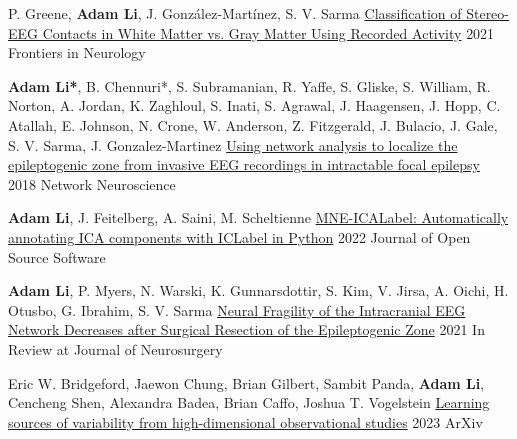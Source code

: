 \begin{cventries}
    \cvpresentation
    {P. Greene, \textbf{Adam Li}, J. González-Martínez, S. V. Sarma} %
    {\href{https://www.ncbi.nlm.nih.gov/pmc/articles/PMC7815703/pdf/fneur-11-605696.pdf}{Classification of Stereo-EEG Contacts in White Matter vs. Gray Matter Using Recorded Activity}} %
    {2021} %
    {Frontiers in Neurology} %
    {\empty}
    {\empty}
    \vspace{-0.9cm}
    
    \cvpresentation
    {\textbf{Adam Li*}, B. Chennuri*, S. Subramanian, R. Yaffe, S. Gliske, S. William, R. Norton, A. Jordan, K. Zaghloul, S. Inati, S. Agrawal, J. Haagensen, J. Hopp, C. Atallah, E. Johnson, N. Crone, W. Anderson, Z. Fitzgerald, J. Bulacio, J. Gale, S. V. Sarma, J. Gonzalez-Martinez} %
    {\href{https://www.ncbi.nlm.nih.gov/pmc/articles/PMC6130438/pdf/netn-02-218.pdf}{Using network analysis to localize the epileptogenic zone from invasive EEG recordings in intractable focal epilepsy }} %
    {2018} %
    {Network Neuroscience} %
    {\empty}
    {\empty}
    \vspace{-0.9cm}
    
    \cvpresentation
    {\textbf{Adam Li}, J. Feitelberg, A. Saini, M. Scheltienne} %
    {\href{https://github.com/openjournals/joss-reviews/issues/4429}{MNE-ICALabel: Automatically annotating ICA components with ICLabel in Python}} %
    {2022} %
    {Journal of Open Source Software} %
    {\empty}
    {\empty}
    \vspace{-0.9cm}
    
    \cvpresentation
    {\textbf{Adam Li}, P. Myers, N. Warski, K. Gunnarsdottir, S. Kim, V. Jirsa, A. Oichi, H. Otusbo, G. Ibrahim, S. V. Sarma} %
    {\href{https://doi.org/10.1101/2021.07.07.21259385}{Neural Fragility of the Intracranial EEG Network Decreases after Surgical Resection of the Epileptogenic Zone}} %
    {2021} %
    {In Review at Journal of Neurosurgery} %
    {\empty}
    {\empty}
    \vspace{-0.9cm}

    \cvpresentation
    {Eric W. Bridgeford, Jaewon Chung, Brian Gilbert, Sambit Panda, \textbf{Adam Li}, Cencheng Shen, Alexandra Badea, Brian Caffo, Joshua T. Vogelstein} %
    {\href{https://arxiv.org/abs/2307.13868}{Learning sources of variability from high-dimensional observational studies}} %
    {2023} %
    {ArXiv} %
    {\empty}
    {\empty}
    \vspace{-0.9cm}
    

\end{cventries}
